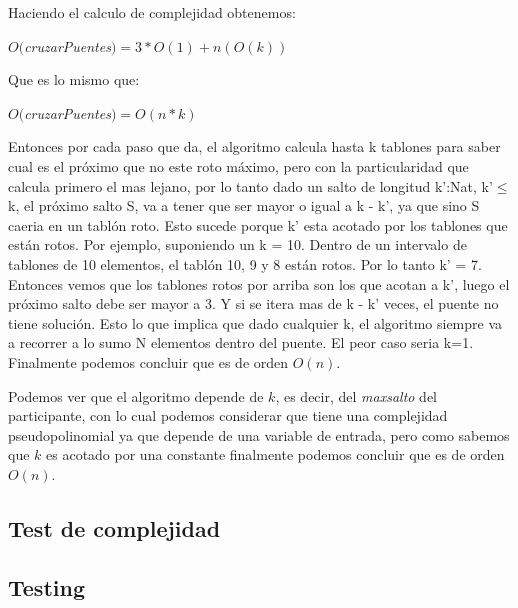 Haciendo el calculo de complejidad obtenemos:

$O($\textit{cruzarPuentes}$) = 3*O(1) + n(O(k))$

Que es lo mismo que:

$O($\textit{cruzarPuentes}$) = O(n*k)$


Entonces por cada paso que da, el algoritmo calcula hasta k tablones para saber cual es el pr\'oximo que no este roto m\'aximo, pero con la particularidad que calcula primero el mas lejano, por lo tanto dado un salto de longitud k':Nat, k'$\leq$ k, el pr\'oximo salto S, va a tener que ser mayor o igual a k - k', ya que sino S caeria en un tabl\'on roto.
Esto sucede porque k' esta acotado por los tablones que est\'an rotos.
Por ejemplo, suponiendo un k = 10. Dentro de un intervalo de tablones de 10 elementos, el tabl\'on 10, 9 y 8 est\'an rotos. Por lo tanto k' = 7. Entonces vemos que los tablones rotos por arriba son los que acotan a k', luego el pr\'oximo salto debe ser mayor a 3. Y si se itera mas de k - k' veces, el puente no tiene soluci\'on.
Esto lo que implica que dado cualquier k, el algoritmo siempre va a recorrer a lo sumo N elementos dentro del puente. El peor caso seria k=1.
Finalmente podemos concluir que es de orden $O(n)$.


Podemos ver que el algoritmo depende de $k$, es decir, del \textit{maxsalto} del participante, con lo cual podemos considerar que tiene una complejidad pseudopolinomial ya que depende de una variable de entrada, pero como sabemos que $k$ es acotado por una constante finalmente podemos concluir que es de orden $O(n)$.

\subsection{Test de complejidad}

\subsection{Testing}

